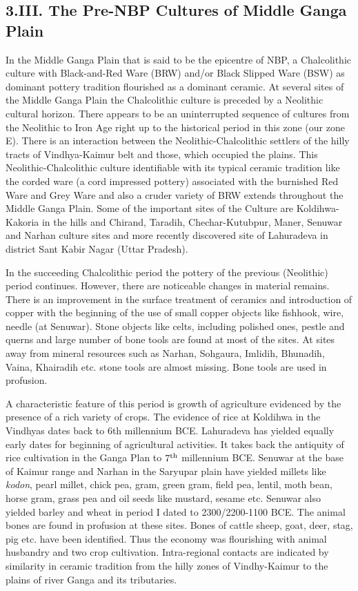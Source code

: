\subsection*{3.III. The Pre-NBP Cultures of Middle Ganga Plain}\label{subsection-10}

In the Middle Ganga Plain that is said to be the epicentre of NBP, a Chalcolithic culture with Black-and-Red Ware (BRW) and/or Black Slipped Ware (BSW) as dominant pottery tradition flourished as a dominant ceramic. At several sites of the Middle Ganga Plain the Chalcolithic culture is preceded by a Neolithic cultural horizon. There appears to be an uninterrupted sequence of cultures from the Neolithic to Iron Age right up to the historical period in this zone (our zone E). There is an interaction between the Neolithic-Chalcolithic settlers of the hilly tracts of Vindhya-Kaimur belt and those, which occupied the plains. This Neolithic-Chalcolithic culture identifiable with its typical ceramic tradition like the corded ware (a cord impressed pottery) associated with the burnished Red Ware and Grey Ware and also a cruder variety of BRW extends throughout the Middle Ganga Plain. Some of the important sites of the Culture are Koldihwa-Kakoria in the hills and Chirand, Taradih, Chechar-Kutubpur, Maner, Senuwar and Narhan culture sites and more recently discovered site of Lahuradeva in district Sant Kabir Nagar (Uttar Pradesh). 

In the succeeding Chalcolithic period the pottery of the previous (Neolithic) period continues. However, there are noticeable changes in material remains. There is an improvement in the surface treatment of ceramics and introduction of copper with the beginning of the use of small copper objects like fishhook, wire, needle (at Senuwar). Stone objects like celts, including polished ones, pestle and querns and large number of bone tools are found at most of the sites. At sites away from mineral resources such as Narhan, Sohgaura, Imlidih, Bhunadih, Vaina, Khairadih etc. stone tools are almost missing. Bone tools are used in profusion.

A characteristic feature of this period is growth of agriculture evidenced by the presence of a rich variety of crops. The evidence of rice at Koldihwa in the Vindhyas dates back to 6th millennium BCE. Lahuradeva has yielded equally early dates for beginning of agricultural activities. It takes back the antiquity of rice cultivation in the Ganga Plan to $7^{\rm th}$ millennium BCE. Senuwar at the base of Kaimur range and Narhan in the Saryupar plain have yielded millets like \textit{kodon}, pearl millet, chick pea, gram, green gram, field pea, lentil, moth bean, horse gram, grass pea and oil seeds like mustard, sesame etc. Senuwar also yielded barley and wheat in period I dated to 2300/2200-1100 BCE. The animal bones are found in profusion at these sites. Bones of cattle sheep, goat, deer, stag, pig etc. have been identified. Thus the economy was flourishing with animal husbandry and two crop cultivation. Intra-regional contacts are indicated by similarity in ceramic tradition from the hilly zones of Vindhy-Kaimur to the plains of river Ganga and its tributaries.

